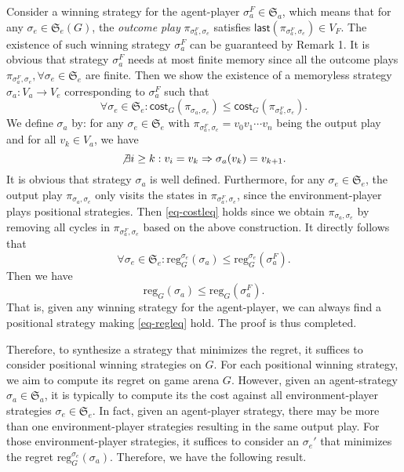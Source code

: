\documentclass{ifacconf}
\def \reg{\text{reg}}
\def \cost{\textsf{cost}}
\def \S{\mathfrak{S}}
\begin{document}
\begin{pf}
Consider a winning strategy for the agent-player $\sigma_a^F\!\in\!\S_a$, which means that for any $\sigma_e\!\in\!\S_e(G)$, the \emph{outcome play} $\pi_{\sigma_a^F,\sigma_e}$ satisfies $\textsf{last}(\pi_{\sigma_a^F,\sigma_e})\!\in\! V_F$. The existence of such winning strategy $\sigma_a^F$ can be guaranteed by Remark 1. 
It is obvious that strategy $\sigma_a^F$ needs at most finite memory since all the outcome plays $\pi_{\sigma_a^F,\sigma_e},\forall\sigma_e\!\in\!\S_e$ are finite. 
Then we show the existence of a memoryless strategy $\sigma_a\!:\!V_a\!\to\! V_e$ corresponding to $\sigma_a^F$ such that 
\begin{equation}\label{eq-costleq}
    \forall \sigma_e\in\S_e:\cost_G(\pi_{\sigma_a,\sigma_e})\leq\cost_G(\pi_{\sigma_a^F,\sigma_e}).
\end{equation}
We define $\sigma_a$ by: for any $\sigma_e\!\in\!\S_e$ with $\pi_{\sigma_a^F,\sigma_e}\!=\!v_0v_1\cdots v_n$ being the output play and for all $v_k\!\in\! V_a$, we have
\begin{equation}
    \not\exists i\geq k:v_i=v_k\Rightarrow\sigma_a(v_k)=v_{k+1}.
\end{equation}
It is obvious that strategy $\sigma_a$ is well defined.
Furthermore, for any $\sigma_e\!\in\!\S_e$, 
the output play 
$\pi_{\sigma_a,\sigma_e}$ only visits the states in $\pi_{\sigma_a^F,\sigma_e}$,
since the environment-player plays positional strategies.
Then \eqref{eq-costleq} holds since we obtain $\pi_{\sigma_a,\sigma_e}$ by removing all cycles in $\pi_{\sigma_a^F,\sigma_e}$ based on the above construction.
It directly follows that
\begin{equation}
    \forall \sigma_e\in\S_e:\reg_G^{\sigma_e}(\sigma_a)\leq \reg_G^{\sigma_e}(\sigma_a^F).
\end{equation}
Then we have
\begin{equation}\label{eq-regleq}
    \reg_G(\sigma_a)\leq\reg_G(\sigma_a^F).
\end{equation}
That is, given any winning strategy for the agent-player, we can always find a positional strategy making \eqref{eq-regleq} hold. The proof is thus completed.
\end{pf}

Therefore, to synthesize a strategy that minimizes the regret, it suffices to consider positional winning strategies on $G$. 
For each positional winning strategy, we aim to compute its regret on game arena $G$. However, given an agent-strategy $\sigma_a\!\in\!\S_a$,
it is typically to compute its the cost against all environment-player strategies $\sigma_e\!\in\!\S_e$. In fact, given an agent-player strategy, there may be more than one environment-player strategies resulting in the same output play. For those environment-player strategies, it suffices to consider an $\sigma_e'$ that minimizes the regret $\reg_G^{\sigma_e}(\sigma_a)$. Therefore, we have the following result.
\end{document}
